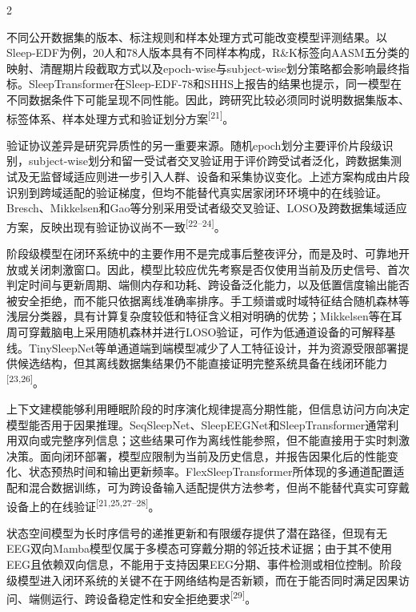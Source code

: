 \documentclass[UTF8,zihao=5,fontset=none]{ctexart}
\newcommand{\song}{\CJKfamily{song}}
\newcommand{\levelthree}[1]{%
  \par\noindent{\song\fontsize{10.5pt}{15.6pt}\selectfont #1}}
\newcommand{\refcite}[1]{\nolinebreak[4]\textsuperscript{[#1]}}
\begin{document}
\begin{multicols}{2}

不同公开数据集的版本、标注规则和样本处理方式可能改变模型评测结果。以Sleep-EDF为例，20人和78人版本具有不同样本构成，R\&K标签向AASM五分类的映射、清醒期片段截取方式以及epoch-wise与subject-wise划分策略都会影响最终指标。SleepTransformer在Sleep-EDF-78和SHHS上报告的结果也提示，同一模型在不同数据条件下可能呈现不同性能。因此，跨研究比较必须同时说明数据集版本、标签体系、样本处理方式和验证划分方案\refcite{21}。\par

验证协议差异是研究异质性的另一重要来源。随机epoch划分主要评价片段级识别，subject-wise划分和留一受试者交叉验证用于评价跨受试者泛化，跨数据集测试及无监督域适应则进一步引入人群、设备和采集协议变化。上述方案构成由片段识别到跨域适配的验证梯度，但均不能替代真实居家闭环环境中的在线验证。Bresch、Mikkelsen和Gao等分别采用受试者级交叉验证、LOSO及跨数据集域适应方案，反映出现有验证协议尚不一致\refcite{22--24}。\par

\levelthree{2.2.3 阶段级表征与上下文模型}
阶段级模型在闭环系统中的主要作用不是完成事后整夜评分，而是及时、可靠地开放或关闭刺激窗口。因此，模型比较应优先考察是否仅使用当前及历史信号、首次判定时间与更新周期、端侧内存和功耗、跨设备泛化能力，以及低置信度输出能否被安全拒绝，而不能只依据离线准确率排序。手工频谱或时域特征结合随机森林等浅层分类器，具有计算复杂度较低和特征含义相对明确的优势；Mikkelsen等在耳周可穿戴脑电上采用随机森林并进行LOSO验证，可作为低通道设备的可解释基线。TinySleepNet等单通道端到端模型减少了人工特征设计，并为资源受限部署提供候选结构，但其离线数据集结果仍不能直接证明完整系统具备在线闭环能力\refcite{23,26}。\par

上下文建模能够利用睡眠阶段的时序演化规律提高分期性能，但信息访问方向决定模型能否用于因果推理。SeqSleepNet、SleepEEGNet和SleepTransformer通常利用双向或完整序列信息；这些结果可作为离线性能参照，但不能直接用于实时刺激决策。面向闭环部署，模型应限制为当前及历史信息，并报告因果化后的性能变化、状态预热时间和输出更新频率。FlexSleepTransformer所体现的多通道配置适配和混合数据训练，可为跨设备输入适配提供方法参考，但尚不能替代真实可穿戴设备上的在线验证\refcite{21,25,27--28}。\par

状态空间模型为长时序信号的递推更新和有限缓存提供了潜在路径，但现有无EEG双向Mamba模型仅属于多模态可穿戴分期的邻近技术证据；由于其不使用EEG且依赖双向信息，不能用于支持因果EEG分期、事件检测或相位控制。阶段级模型进入闭环系统的关键不在于网络结构是否新颖，而在于能否同时满足因果访问、端侧运行、跨设备稳定性和安全拒绝要求\refcite{29}。\par


\end{multicols}
\end{document}
